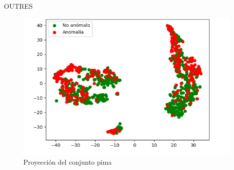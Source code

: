 \documentclass[10pt]{beamer}
\begin{document}
\begin{frame}[fragile]{OUTRES}
\vspace{10px}

\begin{figure}
	\centering
	\includegraphics[scale=0.6]{Imagenes/pima}
	\caption*{Proyección del conjunto pima}
\end{figure}

\end{frame}
\end{document}
